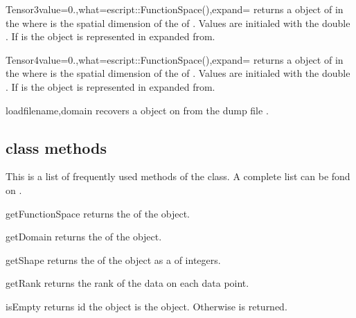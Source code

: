 \begin{funcdesc}{Tensor3}{value=0.,what=escript::FunctionSpace(),expand=\False}
returns a \Data object of \Shape {} in the \FunctionSpace {} 
where  is the spatial dimension of the \Domain of .
Values are initialed with the double . If  is \True
the \Data object is represented in expanded from.
\end{funcdesc}

\begin{funcdesc}{Tensor4}{value=0.,what=escript::FunctionSpace(),expand=\False}
returns a \Data object of \Shape {} in the \FunctionSpace {} 
where  is the spatial dimension of the \Domain of .
Values are initialed with the double . If  is \True
the \Data object is represented in expanded from.
\end{funcdesc}

\begin{funcdesc}{load}{filename,domain}
recovers a \Data object on \Domain {} from the dump file .
\end{funcdesc}

\subsection{\Data class methods}
This is a list of frequently used methods of the 
\Data class. A complete list can be fond on \ReferenceGuide.
\begin{methoddesc}[Data]{getFunctionSpace}{}
returns the \FunctionSpace of the object.
\end{methoddesc}

\begin{methoddesc}[Data]{getDomain}{}
returns the \Domain  of the object.
\end{methoddesc}

\begin{methoddesc}[Data]{getShape}{}
returns the \Shape  of the object as a  of
integers.
\end{methoddesc}

\begin{methoddesc}[Data]{getRank}{}
returns the rank of the data on each data point. 
\end{methoddesc}

\begin{methoddesc}[Data]{isEmpty}{}
returns \True id the \Data object is the \EmptyData object.
Otherwise \False is returned.
\end{methoddesc}

